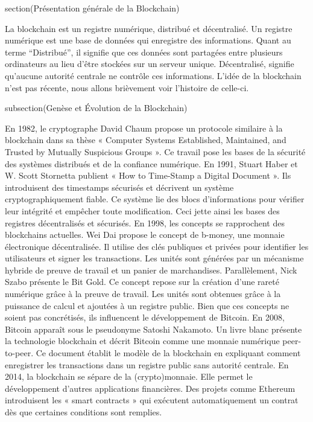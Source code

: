 section(Présentation générale de la Blockchain)

La blockchain est un registre numérique, distribué et décentralisé. Un registre numérique est une base de données qui enregistre des informations. Quant au terme “Distribué”, il signifie que ces données sont partagées entre plusieurs ordinateurs au lieu d’être stockées sur un serveur unique. Décentralisé, signifie qu’aucune autorité centrale ne contrôle ces informations. L’idée de la blockchain n’est pas récente, nous allons brièvement voir l’histoire de celle-ci. 

subsection(Genèse et Évolution de la Blockchain)

En 1982, le cryptographe David Chaum propose un protocole similaire à la blockchain dans sa thèse « Computer Systems Established, Maintained, and Trusted by Mutually Suspicious Groups ». Ce travail pose les bases de la sécurité des systèmes distribués et de la confiance numérique.
En 1991, Stuart Haber et W. Scott Stornetta publient « How to Time-Stamp a Digital Document ». Ils introduisent des timestamps sécurisés et décrivent un système cryptographiquement fiable. Ce système lie des blocs d’informations pour vérifier leur intégrité et empêcher toute modification. Ceci jette ainsi les bases des registres décentralisés et sécurisés.
En 1998, les concepts se rapprochent des blockchains actuelles. Wei Dai propose le concept de b-money, une monnaie électronique décentralisée. Il utilise des clés publiques et privées pour identifier les utilisateurs et signer les transactions. Les unités sont générées par un mécanisme hybride de preuve de travail et un panier de marchandises. Parallèlement, Nick Szabo présente le Bit Gold. Ce concept repose sur la création d'une rareté numérique grâce à la preuve de travail. Les unités sont obtenues grâce à la puissance de calcul et ajoutées à un registre public.
Bien que ces concepts ne soient pas concrétisés, ils influencent le développement de Bitcoin. En 2008, Bitcoin apparaît sous le pseudonyme Satoshi Nakamoto. Un livre blanc présente la technologie blockchain et décrit Bitcoin comme une monnaie numérique peer-to-peer. Ce document établit le modèle de la blockchain en expliquant comment enregistrer les transactions dans un registre public sans autorité centrale.
En 2014, la blockchain se sépare de la (crypto)monnaie. Elle permet le développement d’autres applications financières. Des projets comme Ethereum introduisent les « smart contracts » qui exécutent automatiquement un contrat dès que certaines conditions sont remplies.

